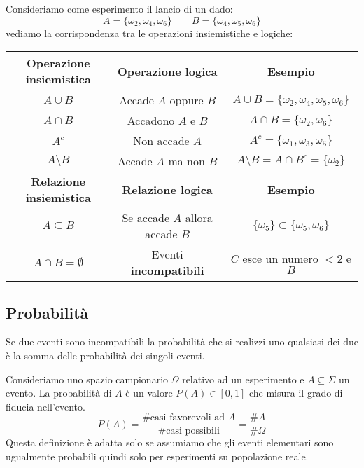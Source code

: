 \noindent Consideriamo come esperimento il lancio di un dado:
\begin{equation*}
	A = \{\omega_2,\omega_4,\omega_6\} \qquad B=\{\omega_4,\omega_5,\omega_6\}
\end{equation*}
vediamo la corrispondenza tra le operazioni insiemistiche e logiche:
\begin{table}[h!]
	\centering
	\begin{tabular}{|c|c|c|}
		\hline
		\textbf{Operazione insiemistica} & \textbf{Operazione logica} & \textbf{Esempio} \\
		\hline
		$A \cup B$ & Accade $A$ oppure $B$ & $A \cup B = \{\omega_2, \omega_4, \omega_5,\omega_6\}$ \\
		$A \cap B$ & Accadono $A$ e $B$ & $A \cap B = \{\omega_2, \omega_6\}$\\
		$A^c$ & Non accade $A$ & $A^c = \{\omega_1, \omega_3, \omega_5\}$\\
		$A \setminus B$ & Accade $A$ ma non $B$ & $A \setminus B = A \cap B^c = \{\omega_2\}$\\
		\hline
		\textbf{Relazione insiemistica} & \textbf{Relazione logica} & \textbf{Esempio}\\
		\hline
		$A \subseteq B$ & Se accade $A$ allora accade $B$ & $\{\omega_5\} \subset \{\omega_5, \omega_6\}$\\
		$A \cap B = \emptyset$ & Eventi \textbf{incompatibili} & $C$ esce un numero $<2$ e $B$\\
		\hline
	\end{tabular}
\end{table}

\subsection{Probabilità}
\begin{observation}
	Se due eventi sono incompatibili la probabilità che si realizzi uno qualsiasi dei due è la somma delle probabilità dei singoli eventi.
\end{observation}

\begin{definition}
	Consideriamo uno spazio campionario $\Omega$ relativo ad un esperimento e $A\subseteq\Sigma$ un evento. La probabilità di $A$ è un valore $P(A) \in [0,1]$ che misura il grado di fiducia nell'evento.
	\begin{equation}
		P(A)=\frac{\#\text{casi favorevoli ad }A}{\#\text{casi possibili}} = \frac{\#A}{\#\Omega}
	\end{equation}
	Questa definizione è adatta solo se assumiamo che gli eventi elementari sono ugualmente probabili quindi solo per esperimenti su popolazione reale.
\end{definition}

